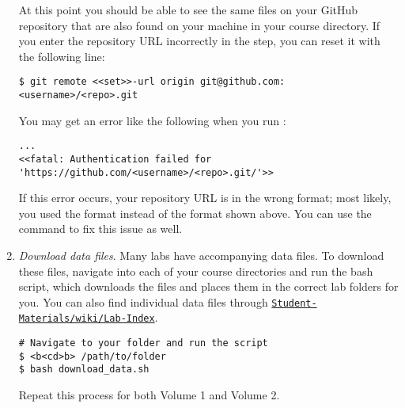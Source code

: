 \begin{enumerate}
    At this point you should be able to see the same files on your GitHub repository that are also found on your machine in your course directory.
    If you enter the repository URL incorrectly in the  step, you can reset it with the following line:
\begin{lstlisting}
$ git remote <<set>>-url origin git@github.com:<username>/<repo>.git
\end{lstlisting}

    \begin{info}
    You may get an error like the following when you run :
\begin{lstlisting}
...
<<fatal: Authentication failed for 'https://github.com/<username>/<repo>.git/'>>
\end{lstlisting}
    If this error occurs, your repository URL is in the wrong format; most likely, you used the  format instead of the  format shown above.
    You can use the  command to fix this issue as well.
    \end{info}
    
    \item \emph{Download data files}.
    \label{step:download-data}
    Many labs have accompanying data files.
    To download these files, navigate into each of your course directories and run the  bash script, which downloads the files and places them in the correct lab folders for you.
    You can also find individual data files through \href{https://github.com/Foundations-of-Applied-Mathematics/Student-Materials/wiki/Lab-Index}{\texttt{Student-Materials/wiki/Lab-Index}}.
    
\begin{lstlisting}
# Navigate to your folder and run the script
$ <b<cd>b> /path/to/folder
$ bash download_data.sh
\end{lstlisting}
    Repeat this process for both Volume 1 and Volume 2.

\end{enumerate}
\fi
\fi
